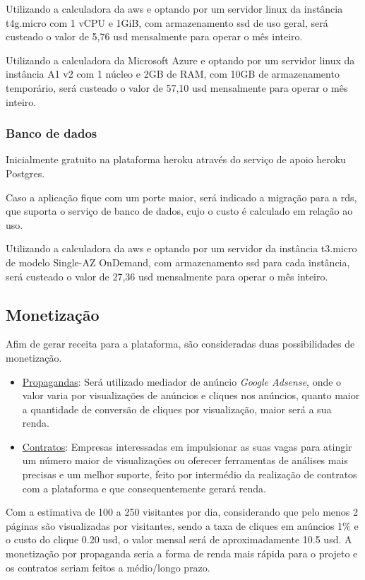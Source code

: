 Utilizando a calculadora da \gls{aws} \cite{aws_calc} e optando por um servidor \gls{linux} da instância
t4g.micro com 1 vCPU e 1GiB, com armazenamento \acs{ssd} de uso geral, será
custeado o valor de 5,76 \acs{usd} mensalmente para operar o mês inteiro.

Utilizando a calculadora da Microsoft Azure \cite{azure_calc} e optando por um servidor \gls{linux} da
instância A1 v2 com 1 núcleo e 2GB de RAM, com 10GB de armazenamento temporário, será 
custeado o valor de 57,10 \acs{usd} mensalmente para operar o mês inteiro.

\subsubsection{Banco de dados}
Inicialmente gratuito na plataforma \gls{heroku} através do serviço de apoio \gls{heroku} Postgres.

Caso a aplicação fique com um porte maior, será indicado a migração para a \gls{rds}, que suporta o serviço de banco de dados, cujo o custo é calculado em relação ao uso.

Utilizando a calculadora da \gls{aws} \cite{aws_calc} e optando por um servidor da instância t3.micro
de modelo Single-AZ OnDemand, com armazenamento \acs{ssd} para cada instância,
será custeado o valor de 27,36 \acs{usd} mensalmente para operar o mês inteiro.

\subsection{Monetização}
Afim de gerar receita para a plataforma, são consideradas duas possibilidades de monetização.

\begin{itemize}
    \item \underline{Propagandas}: Será utilizado mediador de anúncio \emph{Google Adsense}, 
    onde o valor varia por visualizações de anúncios e cliques nos anúncios, quanto maior a quantidade de conversão
    de cliques por visualização, maior será a sua renda. 
    \item \underline{Contratos}: Empresas interessadas em impulsionar as suas vagas para atingir um número maior de visualizações ou 
    oferecer ferramentas de análises mais precisas e um melhor suporte, feito por intermédio da realização de contratos com a plataforma e 
    que consequentemente gerará renda.
\end{itemize}

Com a estimativa de 100 a 250 visitantes por dia, considerando que pelo menos 2 páginas são visualizadas por visitantes,
sendo a taxa de cliques em anúncios 1\% e o custo do clique 0.20 \acs{usd}, o valor mensal será de aproximadamente 10.5 \acs{usd}.
A monetização por propaganda seria a forma de renda mais rápida para o projeto e os contratos seriam feitos
a médio/longo prazo.


